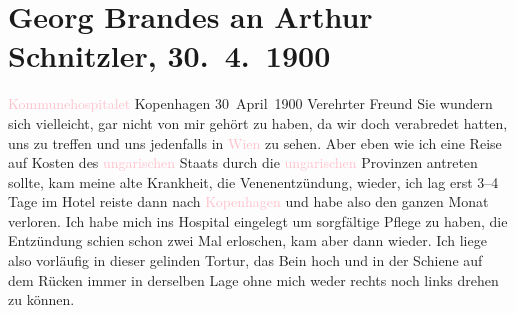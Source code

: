 

               \section[Georg Brandes an Arthur Schnitzler, 30. 4. 1900]{ Georg Brandes an Arthur Schnitzler, 30. 4. 1900}\nopagebreak{}\rehead{ }\normalsize\beginnumbering{} \toendnotes[C]{\smallbreak\pagebreak[2]} 
\toendnotes[C]{\smallbreak}\pstart
           \raggedleft{}{\pb}\textcolor{pink}{Kommunehospitalet}{}\ledrightnote{\textcolor{pink}{Kommunehospitalet}}\pend
           \pstart
           \raggedleft{}Kopenhagen\pend
           \pstart
           \raggedleft{}30 April 1900\pend
           \pstart{}Verehrter Freund\pend\pstart
           Sie wundern sich vielleicht, gar nicht von mir gehört zu haben, da wir doch
                    verabredet hatten, uns zu treffen und uns jedenfalls in \textcolor{pink}{Wien}{}\ledrightnote{\textcolor{pink}{Wien}} zu sehen. Aber eben wie ich eine Reise auf Kosten des
                        \textcolor{pink}{ungarischen}{}\ledrightnote{\textcolor{pink}{Ungarn}}
               Staats durch die \textcolor{pink}{ungarischen}{}\ledrightnote{\textcolor{pink}{Ungarn}} Provinzen antreten sollte, kam
                    meine alte Krankheit, die Venenentzündung, wieder, ich lag erst 3–4 Tage im
                    Hotel reiste dann nach \textcolor{pink}{Kopenhagen}{}\ledrightnote{\textcolor{pink}{Kopenhagen}} und habe
                    also den ganzen Monat verloren. Ich habe mich ins Hospital eingelegt um
                    sorgfältige Pflege zu haben, die Entzündung schien schon zwei Mal erloschen, kam
                    aber dann wieder. Ich liege also vorläufig in dieser gelinden Tortur, das Bein
                    hoch und in der Schiene {\pb}auf
                    dem Rücken immer in derselben Lage ohne mich weder rechts noch links drehen zu
                    können.\pend
